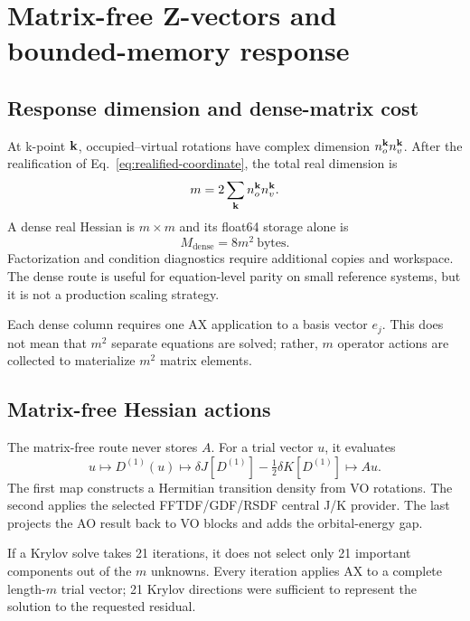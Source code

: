\section{Matrix-free Z-vectors and bounded-memory response}
\label{sec:matrix-free-bounded-memory}

\subsection{Response dimension and dense-matrix cost}

At k-point $\mathbf{k}$, occupied--virtual rotations have complex dimension
$n_o^{\mathbf{k}}n_v^{\mathbf{k}}$.  After the realification of
Eq.~\eqref{eq:realified-coordinate}, the total real dimension is
\begin{equation}
  m=2\sum_{\mathbf{k}}n_o^{\mathbf{k}}n_v^{\mathbf{k}}.
  \label{eq:response-real-dimension}
\end{equation}
A dense real Hessian is $m\times m$ and its float64 storage alone is
\begin{equation}
  M_{\mathrm{dense}}=8m^2\ \text{bytes}.
  \label{eq:dense-hessian-storage}
\end{equation}
Factorization and condition diagnostics require additional copies and
workspace.  The dense route is useful for equation-level parity on small
reference systems, but it is not a production scaling strategy.

Each dense column requires one AX application to a basis vector $e_j$.  This
does not mean that $m^2$ separate equations are solved; rather, $m$ operator
actions are collected to materialize $m^2$ matrix elements.

\subsection{Matrix-free Hessian actions}

The matrix-free route never stores $A$.  For a trial vector $u$, it evaluates
\begin{equation}
  u\longmapsto D^{(1)}(u)
  \longmapsto \delta J[D^{(1)}]-\tfrac12\delta K[D^{(1)}]
  \longmapsto Au.
  \label{eq:matrix-free-action}
\end{equation}
The first map constructs a Hermitian transition density from VO rotations.
The second applies the selected FFTDF/GDF/RSDF central J/K provider.  The last
projects the AO result back to VO blocks and adds the orbital-energy gap.

If a Krylov solve takes 21 iterations, it does not select only 21 important
components out of the $m$ unknowns.  Every iteration applies AX to a complete
length-$m$ trial vector; 21 Krylov directions were sufficient to represent
the solution to the requested residual.

